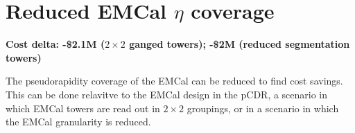 
\section*{Reduced EMCal $\eta$ coverage}
\label{sec:reduced-emcal-eta}

\textbf{Cost delta: -\$2.1M ($2\times 2$ ganged towers); -\$2M
  (reduced segmentation towers)}

The pseudorapidity coverage of the EMCal can be reduced to find cost
savings. This can be done relavitve to the EMCal design in the pCDR, a
scenario in which EMCal towers are read out in $2\times 2$ groupings,
or in a scenario in which the EMCal granularity is reduced.  